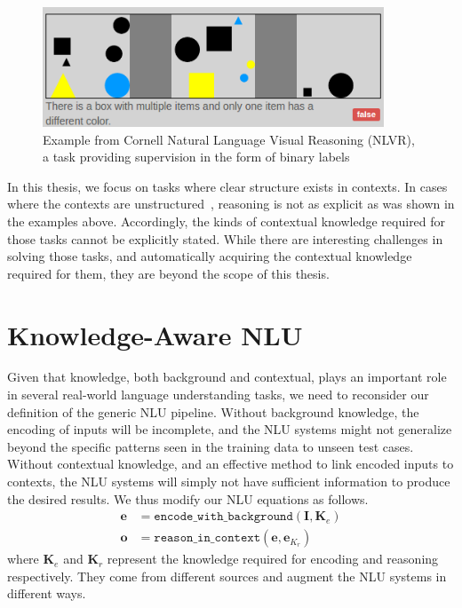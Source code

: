 \begin{figure}
	\begin{center}
	\includegraphics[width=4in]{figures/nlvr_example.png}
	\caption{Example from Cornell Natural Language Visual Reasoning (NLVR), a task providing supervision in the form of binary labels}\label{fig:nlvr_example_intro}
	\end{center}
\end{figure}

In this thesis, we focus on tasks where clear structure exists in contexts. In cases where the contexts are unstructured~\citep{hill2015goldilocks,richardson2013mctest,penas2013qa4mre,breck2001looking},
reasoning is not as explicit as was shown in the examples above. Accordingly, the kinds of contextual
knowledge required for those tasks cannot be explicitly stated.
While there are interesting challenges in solving those tasks, and automatically acquiring the contextual knowledge required for them,
they are beyond the scope of this thesis.

\section{Knowledge-Aware NLU}
Given that knowledge, both background and contextual, plays an important role in several real-world language understanding tasks, we need to reconsider
our definition of the generic NLU pipeline.
Without background knowledge, the encoding of inputs will be incomplete, and the NLU systems might not generalize beyond the specific patterns 
seen in the training data to unseen test cases. Without contextual knowledge, and an effective method to link encoded inputs to contexts, the NLU
systems will simply not have sufficient information to produce the desired results. We thus modify our NLU equations as follows.
\begin{align}
 \mathbf{e} &= \mathtt{encode\_with\_background}(\mathbf{I}, \mathbf{K}_e) \label{eq:encoding_with_knowledge}\\
 \mathbf{o} &= \mathtt{reason\_in\_context}(\mathbf{e}, \mathbf{e}_{K_r}) \label{eq:reasoning_with_knowledge}
\end{align}
where $\mathbf{K}_e$ and $\mathbf{K}_r$ represent the knowledge required for encoding and reasoning respectively. They
come from different sources and augment the NLU systems in different ways.

